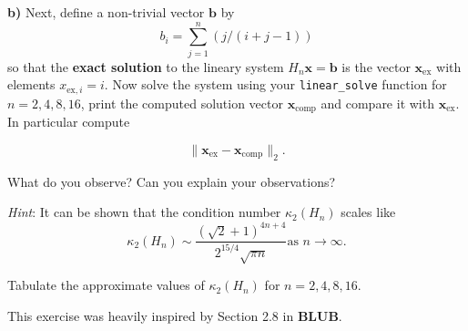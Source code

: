 \documentclass[11pt]{article}
\begin{document}
    \textbf{b)} Next, define a non-trivial vector \(\boldsymbol{b}\) by \[
b_i = \sum_{j=1}^n (j/(i+j-1)) 
\] so that the \textbf{exact solution} to the lineary system
\(H_n \boldsymbol{x} = \boldsymbol{b}\) is the vector
\(\boldsymbol{x}_{\mathrm{ex}}\) with elements
\(x_{\mathrm{ex},i} = i\). Now solve the system using your
\texttt{linear\_solve} function for \(n = 2, 4, 8, 16\), print the
computed solution vector \(\boldsymbol{x}_{\mathrm{comp}}\) and compare
it with \(\boldsymbol{x}_{\mathrm{ex}}\). In particular compute

\[\|\boldsymbol{x}_{\mathrm{ex}}-\boldsymbol{x}_{\mathrm{comp}}\|_2.\]

What do you observe? Can you explain your observations?

\emph{Hint}: It can be shown that the condition number \(\kappa_2(H_n)\)
scales like \[
\kappa_2(H_n) \sim \dfrac{\left(\sqrt{2}+1\right)^{4n+4}}{2^{15/4}\sqrt{\pi n}}
\text{as } n \to  \infty.
\]

Tabulate the approximate values of \(\kappa_2(H_n)\) for
\(n = 2, 4, 8, 16\).

This exercise was heavily inspired by Section 2.8 in \textbf{BLUB}.


    
    
    
    
\end{document}
